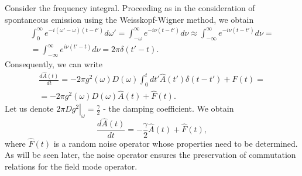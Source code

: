 Consider the frequency integral. Proceeding as in the consideration of spontaneous emission using the Weisskopf-Wigner method, we obtain
\begin{eqnarray}
\int_0^{\infty}e^{- i\left(\omega' -
  \omega\right)\left(t - t'\right)} d \omega' = 
\int_{-\omega}^{\infty} e^{-i \nu \left(t - t'\right)} d \nu \approx 
\int_{-\infty}^{\infty} e^{-i \nu \left(t - t'\right)} d \nu = 
\nonumber \\
= \int_{-\infty}^{\infty} e^{i \nu \left(t' - t\right)} d \nu = 
2 \pi \delta\left(t' - t\right).
\nonumber
\end{eqnarray}
Consequently, we can write
\begin{eqnarray}
\frac{d \hat{A}\left(t\right)}{d t} = 
- 2 \pi g^2\left(\omega\right) 
D\left(\omega\right)
\int_0^t d t'
  \hat{A}\left(t'\right)
\delta\left(t - t'\right)  + \hat{F}\left(t\right) = 
\nonumber \\
=
- 2 \pi g^2\left(\omega\right) 
D\left(\omega\right) \hat{A}\left(t\right)
 + \hat{F}\left(t\right).
\nonumber
\end{eqnarray}
 Let us denote 
\(
\left.2 \pi D g^2\right|_{\omega} = \frac{\gamma}{2}
\) - the damping coefficient. We obtain
\begin{equation}
\frac{d \hat{A}\left(t\right)}{d t} = 
- \frac{\gamma}{2} \hat{A}\left(t\right) + 
\hat{F}\left(t\right),
\label{eqPart1Ch2_LanzgevenAeq}
\end{equation}
where $\hat{F}\left(t\right)$ is a random noise operator whose properties need to be determined. As will be seen later, the noise operator ensures the preservation of commutation relations for the field mode operator.


